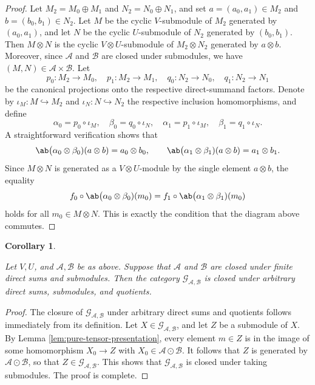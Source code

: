 \documentclass[12pt, english]{article}
\numberwithin{equation}{section}
\theoremstyle{plain}
\newtheorem{corollary}[lemma]{Corollary}
\theoremstyle{definition}
\theoremstyle{remark}
\begin{document}
	\begin{proof}
		
		Let $M_2 = M_0 \oplus M_1$ and $N_2 = N_0 \oplus N_1$, and set $a = (a_0, a_1) \in M_2$ and $b = (b_0, b_1) \in N_2$.
		Let $M$ be the cyclic $V$-submodule of $M_2$ generated by $(a_0, a_1)$, and let  $N$ be the cyclic $U$-submodule of $N_2$ generated by $(b_0, b_1)$.
		Then $M \otimes N$ is the cyclic $V \otimes U$-submodule of $M_2 \otimes N_2$ generated by $a \otimes b$.
		Moreover, since $\mathcal{A}$ and $\mathcal{B}$ are closed under submodules, we have $(M, N) \in \mathcal{A} \times \mathcal{B} $.
		Let
		\[
		p_0 \colon M_2 \to M_0, \quad p_1 \colon M_2 \to M_1, \quad
		q_0 \colon N_2 \to N_0, \quad q_1 \colon N_2 \to N_1
		\]
		be the canonical projections onto the respective direct-summand factors.
		Denote by $\iota_M\colon M \hookrightarrow M_2$ and $\iota_N\colon N \hookrightarrow N_2$ the respective inclusion homomorphisms, and define
		\[
		\alpha_0 = p_0 \circ \iota_M, \quad \beta_0 = q_0 \circ \iota_N, \quad \alpha_1 = p_1 \circ \iota_M, \quad \beta_1 = q_1 \circ \iota_N.
		\]
		A straightforward verification shows that
		\[
		\ab\big(\alpha_0 \otimes \beta_0) (a \otimes b) = a_0 \otimes b_0, \qquad \ab\big(\alpha_1 \otimes \beta_1) (a \otimes b) = a_1 \otimes b_1.
		\]
		Since $M\otimes N$ is generated as a $V\otimes U$-module by the single element $a\otimes b$, the equality
		\[
		f_0 \circ \ab\big(\alpha_0 \otimes \beta_0) (m_0) = f_1 \circ \ab\big(\alpha_1 \otimes \beta_1) (m_0)
		\]
		holds for all $m_0 \in M \otimes N$.
		This is exactly the condition that the diagram above commutes.
		
	\end{proof}
	
	\begin{corollary} \label{cor:generated-category-closure}
		
		Let $V, U$, and $\mathcal{A}, \mathcal{B}$ be as above.
		Suppose that $\mathcal{A}$ and $\mathcal{B}$ are closed under finite direct sums and submodules.
		Then the category $\mathcal{G}_{\mathcal{A}, \mathcal{B}}$ is closed under arbitrary direct sums, submodules, and quotients.
		
	\end{corollary}
	
	\begin{proof}
		
		The closure of $\mathcal{G}_{\mathcal{A}, \mathcal{B}}$ under arbitrary direct sums and quotients follows immediately from its definition.
		Let $X \in \mathcal{G}_{\mathcal{A}, \mathcal{B}}$, and let $Z$ be a submodule of $X$.
		By Lemma \ref{lem:pure-tensor-presentation}, every element $m \in Z$ is in the image of some homomorphism $X_0 \to Z$ with
		$X_0 \in \mathcal{A}\odot\mathcal{B}$.
		It follows that $Z$ is generated by $\mathcal{A}\odot\mathcal{B}$, so that $Z \in \mathcal{G}_{\mathcal{A}, \mathcal{B}}$.
		This shows that $\mathcal{G}_{\mathcal{A}, \mathcal{B}}$ is closed under taking submodules.
		The proof is complete.
		
	\end{proof}
	
\end{document}
